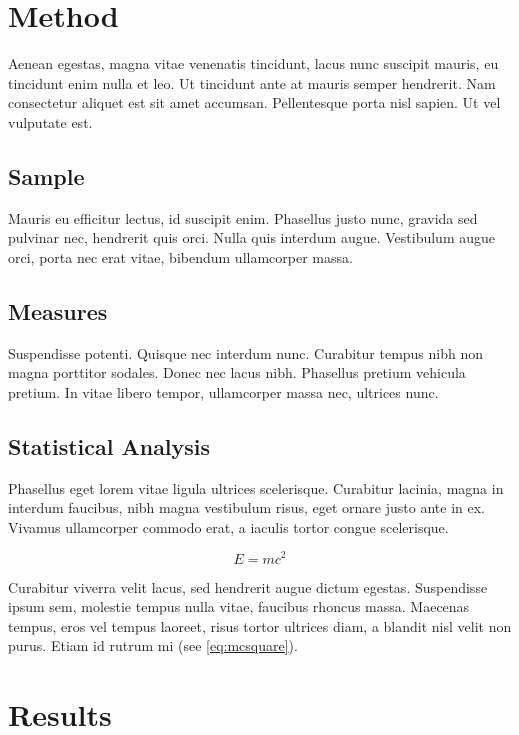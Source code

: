 \documentclass[a4paper,12pt,stu,donotrepeattitle,floatsintext,twoside]{apa7}
\begin{document}
\section{Method}\label{sec:Method}

Aenean egestas, magna vitae venenatis tincidunt, lacus nunc suscipit mauris, eu tincidunt enim nulla et leo. Ut tincidunt ante at mauris semper hendrerit. Nam consectetur aliquet est sit amet accumsan. Pellentesque porta nisl sapien. Ut vel vulputate est.

\subsection{Sample}

Mauris eu efficitur lectus, id suscipit enim. Phasellus justo nunc, gravida sed pulvinar nec, hendrerit quis orci. Nulla quis interdum augue. Vestibulum augue orci, porta nec erat vitae, bibendum ullamcorper massa.

\subsection{Measures}

Suspendisse potenti. Quisque nec interdum nunc. Curabitur tempus nibh non magna porttitor sodales. Donec nec lacus nibh. Phasellus pretium vehicula pretium. In vitae libero tempor, ullamcorper massa nec, ultrices nunc.

\subsection{Statistical Analysis}

Phasellus eget lorem vitae ligula ultrices scelerisque. Curabitur lacinia, magna in interdum faucibus, nibh magna vestibulum risus, eget ornare justo ante in ex. Vivamus ullamcorper commodo erat, a iaculis tortor congue scelerisque.

\begin{equation}\label{eq:mcsquare}
    E=mc^2
\end{equation}

Curabitur viverra velit lacus, sed hendrerit augue dictum egestas. Suspendisse ipsum sem, molestie tempus nulla vitae, faucibus rhoncus massa. Maecenas tempus, eros vel tempus laoreet, risus tortor ultrices diam, a blandit nisl velit non purus. Etiam id rutrum mi (see \cref{eq:mcsquare}).

\section{Results}
\label{sec:4}
\end{document}

